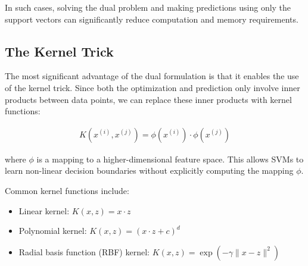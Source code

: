 \documentclass{article}
\begin{document}
In such cases, solving the dual problem and making predictions using only the support vectors can significantly reduce computation and memory requirements.

\subsection{The Kernel Trick}
The most significant advantage of the dual formulation is that it enables the use of the kernel trick. Since both the optimization and prediction only involve inner products between data points, we can replace these inner products with kernel functions:

\begin{align}
K(x^{(i)}, x^{(j)}) = \phi(x^{(i)}) \cdot \phi(x^{(j)})
\end{align}

where $\phi$ is a mapping to a higher-dimensional feature space. This allows SVMs to learn non-linear decision boundaries without explicitly computing the mapping $\phi$.

Common kernel functions include:
\begin{itemize}
    \item Linear kernel: $K(x, z) = x \cdot z$
    \item Polynomial kernel: $K(x, z) = (x \cdot z + c)^d$
    \item Radial basis function (RBF) kernel: $K(x, z) = \exp(-\gamma \|x - z\|^2)$
\end{itemize}
\end{document}
